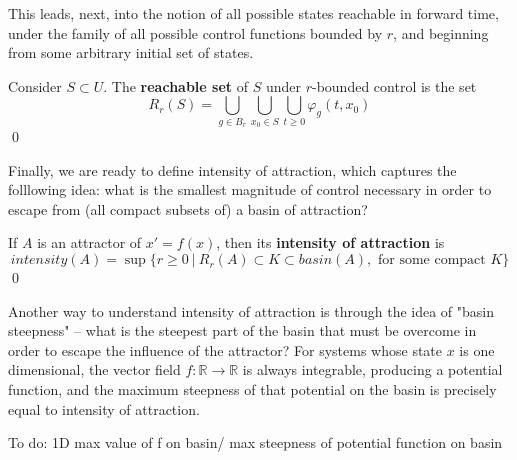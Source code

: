
This leads, next, into the notion of all possible states reachable in forward time, under the family of all possible control functions bounded by $r$, and beginning from some arbitrary initial set of states.  

\begin{definition}
	Consider $S\subset  U$. The \textbf{reachable set} of $S$ under $r$-bounded control is the set
	$$R_r(S) =  \bigcup\limits_{g \in B_r} \bigcup\limits_{x_0 \in S} \bigcup\limits_{t \geq 0}  \varphi_g(t,x_0)$$ \qed
\end{definition}

Finally, we are ready to define intensity of attraction, which captures the folllowing idea: what is the smallest magnitude of control necessary in order to escape from (all compact subsets of) a basin of attraction? 

\begin{definition}
	If $A$ is an attractor of $x' = f(x)$, then its \textbf{intensity of attraction} is 
	$$intensity(A) = \sup\{ r \geq 0 ~|~ R_r(A) \subset K \subset basin(A), \text{ for some compact }K \}$$ \qed
\end{definition}

Another way to understand intensity of attraction is through the idea of "basin steepness" -- what is the steepest part of the basin that must be overcome in order to escape the influence of the attractor? For systems whose state $x$ is one dimensional, the vector field $f: \mathbb{R} \to \mathbb{R}$ is always integrable, producing a potential function, and the maximum steepness of that potential on the basin is precisely equal to intensity of attraction. 

\begin{proposition}
	To do: 1D max value of f on basin/ max steepness of potential function on basin
\end{proposition}

